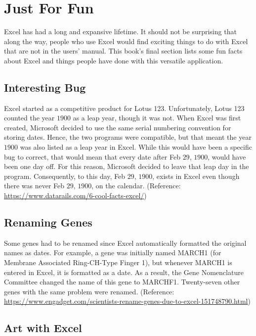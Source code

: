 \section{Just For Fun}

Excel has had a long and expansive lifetime. It should not be surprising that along the way, people who use Excel would find exciting things to do with Excel that are not in the users' manual. This book's final section lists some fun facts about Excel and things people have done with this versatile application.

\subsection{Interesting Bug}

Excel started as a competitive product for Lotus 123. Unfortunately, Lotus 123 counted the year $ 1900 $ as a leap year, though it was not. When Excel was first created, Microsoft decided to use the same serial numbering convention for storing dates. Hence, the two programs were compatible, but that meant the year $ 1900 $ was also listed as a leap year in Excel. While this would have been a specific bug to correct, that would mean that every date after Feb $ 29 $, $ 1900 $, would have been one day off. For this reason, Microsoft decided to leave that leap day in the program. Consequently, to this day, Feb $ 29 $, $ 1900 $, exists in Excel even though there was never Feb $ 29 $, $ 1900 $, on the calendar. (Reference: \url{https://www.datarails.com/6-cool-facts-excel/})

\subsection{Renaming Genes}

Some genes had to be renamed since Excel automatically formatted the original names as dates. For example, a gene was initially named MARCH1 (for Membrane Associated Ring-CH-Type Finger 1), but whenever MARCH1 is entered in Excel, it is formatted as a date. As a result, the Gene Nomenclature Committee changed the name of this gene to MARCHF1. Twenty-seven other genes with the same problem were renamed. (Reference: \url{https://www.engadget.com/scientists-rename-genes-due-to-excel-151748790.html})

\subsection{Art with Excel}

